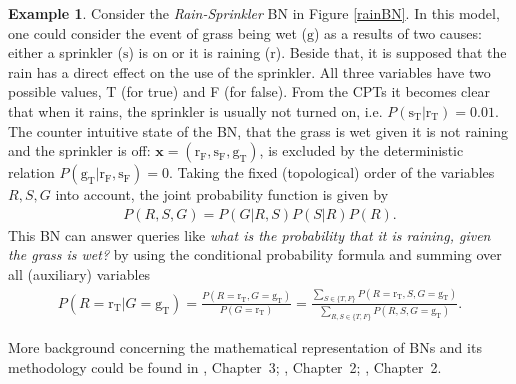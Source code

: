 \documentclass[a4paper, twoside, 11pt]{report}
\newcommand{\bfx}{{\mathbf{x}}}
\theoremstyle{plain}
\theoremstyle{definition}
\newtheorem{example}[thm]{Example}
\theoremstyle{remark}
\renewcommand{\gg}{{\text{g} }}
\newcommand{\gT}{{\text{g}_\text{T} }}
\renewcommand{\ss}{{\text{s} }}
\newcommand{\sT}{{\text{s}_\text{T} }}
\newcommand{\sF}{{\text{s}_\text{F} }}
\newcommand{\rr}{{\text{r} }}
\newcommand{\rT}{{\text{r}_\text{T} }}
\newcommand{\rF}{{\text{r}_\text{F} }}
\begin{document}
\begin{example}\label{ex:rain-sprinkler}
Consider the \textit{Rain-Sprinkler} BN in Figure \ref{rainBN}. In this model, one could consider the event of grass being wet ($\gg$) as a results of two causes: either a sprinkler ($\ss$) is on or it is raining ($\rr$). Beside that, it is supposed that the rain has a direct effect on the use of the sprinkler. All three variables have two possible values, T (for true) and F (for false). From the CPTs it becomes clear that when it rains, the sprinkler is usually not turned on, i.e. $P( \sT |  \rT) = 0.01$. The counter intuitive state of the BN, that the grass is wet given it is not raining and the sprinkler is off: $\bfx = (\rF,  \sF, \gT)$, is excluded by the deterministic relation $P(\gT | \rF,  \sF) = 0$.  Taking the fixed (topological) order of the variables $R, S, G$ into account, the joint probability function is given by
\begin{align}
P(R, S, G) = P(G | R, S) P(S|R) P(R).
\label{eq:jointprob}
\end{align}
This BN can answer queries like \textit{what is the probability that it is raining, given the grass is wet?} by using the conditional probability formula and summing over all (auxiliary) variables
\begin{align}
P(R = \rT | G = \gT) = \frac{P(R = \rT, G = \gT)}{P(G = \rT)} = \frac{\sum_{S \in \{T,F\}} P(R = \rT, S, G = \gT)}{\sum_{R, S \in \{T,F\}} P(R, S, G = \gT)}.
\label{eq:conditional-summation}
\end{align}
\end{example}
More background concerning the mathematical representation of BNs and its methodology could be found in \cite{koller2009probabilistic}, Chapter~3; \cite{nielsen2009bayesian}, Chapter~2; \cite{pearl2014probabilistic}, Chapter~2. 
\end{document}
